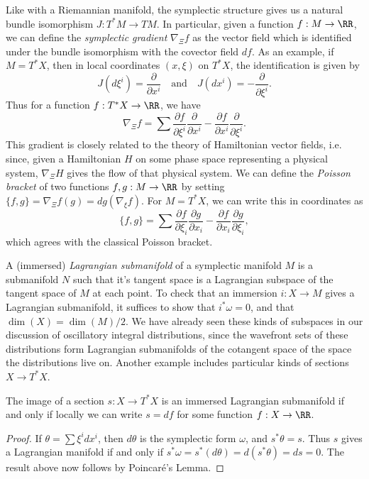 Like with a Riemannian manifold, the symplectic structure gives us a natural bundle isomorphism $J: T^*M \to TM$. In particular, given a function $f : M \to \RR$, we can define the \emph{symplectic gradient} $\nabla_{\Xi} f$ as the vector field which is identified under the bundle isomorphism with the covector field $df$. As an example, if $M = T^* X$, then in local coordinates $(x,\xi)$ on $T^* X$, the identification is given by
%
\[ J(d\xi^i) = \frac{\partial}{\partial x^i} \quad\text{and}\quad J \left( dx^i \right) = - \frac{\partial}{\partial \xi^i}. \]
%
Thus for a function $f: T^* X \to \RR$, we have
%
\[ \nabla_{\Xi} f = \sum \frac{\partial f}{\partial \xi^i} \frac{\partial}{\partial x^i} - \frac{\partial f}{\partial x^i} \frac{\partial}{\partial \xi^i}. \]
%
This gradient is closely related to the theory of Hamiltonian vector fields, i.e. since, given a Hamiltonian $H$ on some phase space representing a physical system, $\nabla_{\Xi} H$ gives the flow of that physical system. We can define the \emph{Poisson bracket} of two functions $f,g: M \to \RR$ by setting $\{ f, g \} = \nabla_\Xi f (g) = dg ( \nabla_\xi f)$. For $M = T^* X$, we can write this in coordinates as
%
\[ \{ f, g \} = \sum \frac{\partial f}{\partial \xi_i} \frac{\partial g}{\partial x_i} - \frac{\partial f}{\partial x_i} \frac{\partial g}{\partial \xi_i}, \]
%
which agrees with the classical Poisson bracket.

A (immersed) \emph{Lagrangian submanifold} of a symplectic manifold $M$ is a submanifold $N$ such that it's tangent space is a Lagrangian subspace of the tangent space of $M$ at each point. To check that an immersion $i: X \to M$ gives a Lagrangian submanifold, it suffices to show that $i^* \omega = 0$, and that $\dim(X) = \dim(M)/2$. We have already seen these kinds of subspaces in our discussion of oscillatory integral distributions, since the wavefront sets of these distributions form Lagrangian submanifolds of the cotangent space of the space the distributions live on. Another example includes particular kinds of sections $X \to T^* X$.

\begin{lemma}
    The image of a section $s: X \to T^* X$ is an immersed Lagrangian submanifold if and only if locally we can write $s = d f$ for some function $f: X \to \RR$.
\end{lemma}
\begin{proof}
    If $\theta = \sum \xi^i dx^i$, then $d\theta$ is the symplectic form $\omega$, and $s^* \theta = s$. Thus $s$ gives a Lagrangian manifold if and only if $s^* \omega = s^*(d \theta) = d(s^* \theta) = ds = 0$. The result above now follows by Poincar\'{e}'s Lemma.
\end{proof}

